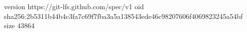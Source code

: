 version https://git-lfs.github.com/spec/v1
oid sha256:2b5311b44b4c3fa7c69f7fba3a5a138543ede46c98207606f4069823245a54bf
size 43864
